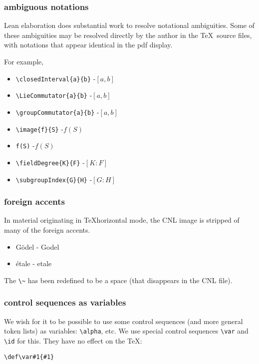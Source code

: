 \documentclass[12pt]{amsart}
\begin{document}
\subsubsection{ambiguous notations}

Lean elaboration does substantial work to resolve
notational ambiguities.  Some of these ambiguities
may be resolved directly by the author in the
\TeX\ source files, with notations that appear identical
in the pdf display.

For example,
\begin{itemize}
\item \verb!\closedInterval{a}{b}! -\qquad $[a,b]$
\item \verb!\LieCommutator{a}{b}! -\qquad $[a,b]$
\item \verb!\groupCommutator{a}{b}! -\qquad $[a,b]$
\item \verb!\image{f}{S}! -\qquad $f(S)$
\item \verb!f(S)! -\qquad $f(S)$
\item \verb!\fieldDegree{K}{F}! -\qquad $[K:F]$
\item \verb!\subgroupIndex{G}{H}! -\qquad $[G:H]$
\end{itemize}

\subsubsection{foreign accents}

In material originating in \TeX horizontal mode, 
the CNL image is
stripped of many of the foreign accents.

\begin{itemize}
\item G\"odel - Godel
\item \'etale - etale
\end{itemize}

The \verb!\~! has been redefined to be a space (that disappears in the CNL file).

\subsubsection{control sequences as variables}

We wish for it to be possible to use some control sequences (and more general token lists)
as variables: \verb!\alpha!, etc.
We use special control sequences \verb!\var! and \verb!\id! for this.
They have no effect on the \TeX:

\verb!\def\var#1{#1}!
\end{document}
